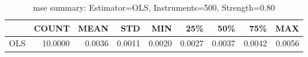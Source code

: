 \begin{table}[ht]
\centering
\caption{mse summary: Estimator=OLS, Instruments=500, Strength=0.80}
\begin{tabular}{lrrrrrrrr}
\toprule
 & COUNT & MEAN & STD & MIN & 25\% & 50\% & 75\% & MAX \\
\midrule
OLS & 10.0000 & 0.0036 & 0.0011 & 0.0020 & 0.0027 & 0.0037 & 0.0042 & 0.0056 \\
\bottomrule
\end{tabular}
\end{table}
